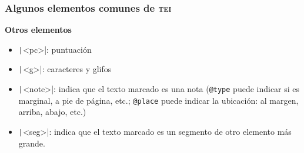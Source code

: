 \documentclass[%
  handout, %
  xcolor=svgnames]{beamer}
\newcommand*{\azul}[1]{\textcolor[HTML]{14145A}{#1}}
\newcommand*{\TEI}{\textsc{tei}}
\begin{document}
\begin{frame}
  \frametitle{Algunos elementos comunes de \TEI}

  \textbf{\azul{Otros elementos}}

  \smallskip

  \begin{itemize}
    \item \texttt|<pc>|: puntuación 
    \item \texttt|<g>|: caracteres y glifos
    \item \texttt|<note>|: indica que el texto marcado es una nota (\texttt{@type} puede indicar si es marginal, a pie de página, etc.; \texttt{@place} puede indicar la ubicación: al margen, arriba, abajo, etc.)
    \item \texttt|<seg>|: indica que el texto marcado es un segmento de otro elemento más grande. 
  \end{itemize}
\end{frame}
\end{document}
